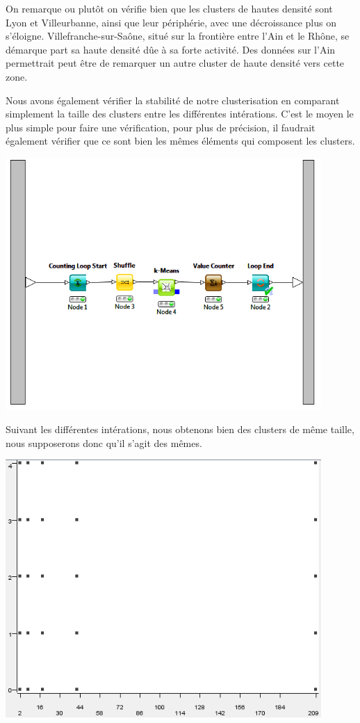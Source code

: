 On remarque ou plutôt on vérifie bien que les clusters de hautes densité sont Lyon et Villeurbanne, ainsi que leur périphérie, avec une décroissance plus on s'éloigne. Villefranche-sur-Saône, situé sur la frontière entre l'Ain et le Rhône, se démarque part sa haute densité dûe à sa forte activité. Des données sur l'Ain permettrait peut être de remarquer un autre cluster de haute densité vers cette zone.

Nous avons également vérifier la stabilité de notre clusterisation en comparant simplement la taille des clusters entre les différentes intérations. C'est le moyen le plus simple pour faire une vérification, pour plus de précision, il faudrait également vérifier que ce sont bien les mêmes éléments qui composent les clusters.

\begin{center}
	\includegraphics[width=0.9\textwidth]{png/Outil_de_vérification_de_la_stabilité_de_la_clusterisation_en_fonction_de_la_densité_de_population.png}
\end{center}

Suivant les différentes intérations, nous obtenons bien des clusters de même taille, nous supposerons donc qu'il s'agit des mêmes.

\begin{center}
	\includegraphics[width=0.9\textwidth]{png/visualisation_de_la_stabilité_de_la_clusterisation_en_fonction_de_la_densité_de_population.png}
\end{center}

